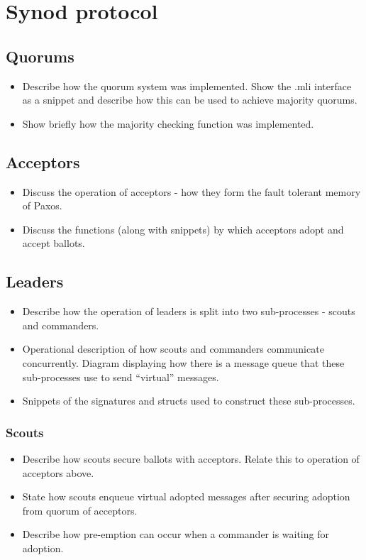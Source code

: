 \section{Synod protocol}

\subsection{Quorums}
\begin{itemize}
  \item Describe how the quorum system was implemented. Show the .mli interface as a snippet and describe how this can be used to achieve majority quorums.
  \item Show briefly how the majority checking function was implemented.
\end{itemize}

\subsection{Acceptors}
\begin{itemize}
  \item Discuss the operation of acceptors - how they form the fault tolerant memory of Paxos.
  \item Discuss the functions (along with snippets) by which acceptors adopt and accept ballots.
\end{itemize}

\subsection{Leaders}
\begin{itemize}
  \item Describe how the operation of leaders is split into two sub-processes - scouts and commanders.
  \item Operational description of how scouts and commanders communicate concurrently. Diagram displaying how there is a message queue that these sub-processes use to send ``virtual'' messages.
  \item Snippets of the signatures and structs used to construct these sub-processes. 
\end{itemize}

\subsubsection{Scouts}
\begin{itemize}
  \item Describe how scouts secure ballots with acceptors. Relate this to operation of acceptors above.
  \item State how scouts enqueue virtual adopted messages after securing adoption from quorum of acceptors.
  \item Describe how pre-emption can occur when a commander is waiting for adoption.
\end{itemize}

